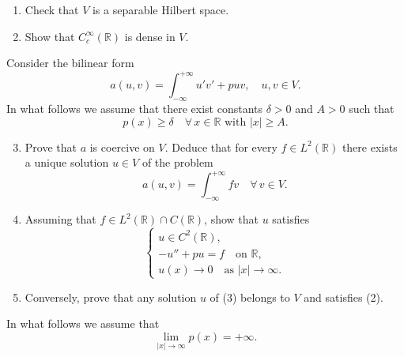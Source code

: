 \documentclass[12pt]{article}
\newcommand{\abs}[1]{\left|#1\right|}
\newcommand{\R}{\mathbb{R}}
\begin{document}
\begin{enumerate}
\item Check that $V$ is a separable Hilbert space.
 
\item Show that $C^\infty_c(\R)$ is dense in $V$.
 
\end{enumerate}
 
\noindent Consider the bilinear form
\[
a(u,v) = \int_{-\infty}^{+\infty} u'v' + puv, \quad u, v \in V.
\]
In what follows we assume that there exist constants $\delta > 0$ and $A > 0$ such that
\begin{equation}\tag{1}
p(x) \ge \delta \quad \forall\, x \in \R \text{ with } \abs{x} \ge A.
\end{equation}
 
\begin{enumerate}
\setcounter{enumi}{2}
\item Prove that $a$ is coercive on $V$. Deduce that for every $f \in L^2(\R)$ there exists
a unique solution $u \in V$ of the problem
\begin{equation}\tag{2}
a(u,v) = \int_{-\infty}^{+\infty} fv \quad \forall\, v \in V.
\end{equation}
 
\item Assuming that $f \in L^2(\R) \cap C(\R)$, show that $u$ satisfies
\begin{equation}\tag{3}
\begin{cases}
u \in C^2(\R),\\
-u'' + pu = f \quad \text{on } \R,\\
u(x) \to 0 \quad \text{as } \abs{x} \to \infty.
\end{cases}
\end{equation}
 
\item Conversely, prove that any solution $u$ of (3) belongs to $V$ and satisfies (2).
 
\noindent[\textit{Hint:} Multiply the equation $-u'' + pu = f$ by $\zeta_n^2 u$ and use the fact that
$a$ is coercive.]
\end{enumerate}
 
\noindent In what follows we assume that
\begin{equation}\tag{4}
\lim_{\abs{x}\to\infty} p(x) = +\infty.
\end{equation}
 
\end{document}
